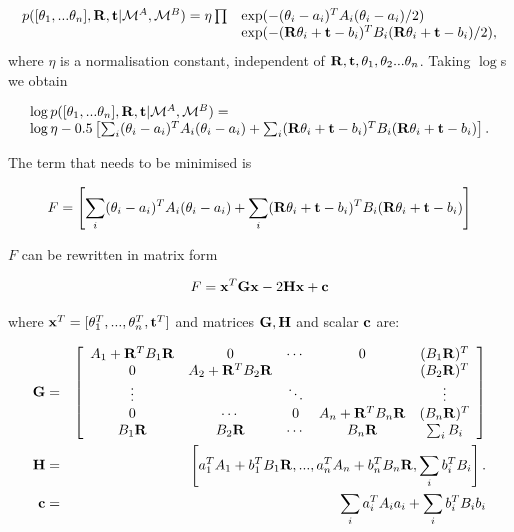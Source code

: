 \begin{equation}
\begin{array}{ll}
p([\theta_1, ...\theta_n],{\bf R},{\bf t} | \mapA, \mapB) =
 \eta \prod& \exp(-(\theta_i - a_i)^T A_i (\theta_i - a_i)/2)\\
&\exp(-({\bf R}\theta_i + {\bf t} - b_i)^T B_i
({\bf R}\theta_i + {\bf t} - b_i)/2),
\label{eqn:align_w0}
\end{array}
\end{equation}
where $\eta$ is a normalisation constant, independent of ${\bf
R,t},\theta_1, \theta_2 ...\theta_n$. Taking $\log$s we obtain

\begin{equation}
\begin{array}{l}
\log p([\theta_1, ...\theta_n],{\bf R},{\bf t} | \mapA, \mapB) =\\
\log\eta - 0.5 \left[
\sum_i (\theta_i - a_i)^T A_i (\theta_i - a_i) +
\sum_i ({\bf R}\theta_i + {\bf t} - b_i)^T B_i({\bf R}\theta_i + {\bf t} - b_i)
\right].
\end{array}
\label{eqn:align_log_prob}
\end{equation}

The term that needs to be minimised is

$$
F = \left[ \sum_i (\theta_i - a_i)^T A_i (\theta_i - a_i) +
\sum_i ({\bf R}\theta_i + {\bf t} - b_i)^T B_i ({\bf R}\theta_i + {\bf t} - b_i)
\right]
$$

$F$ can be rewritten in matrix form

$$
F =  {\bf x}^T{\bf Gx} -2{\bf Hx} + {\bf c}
$$

where ${\bf x}^T = [\theta_1^T,...,\theta_n^T, {\bf t}^T]$ and
matrices ${\bf G},{\bf H}$ and scalar ${\bf c}$ are:

\begin{eqnarray}
{\bf G} &=& \left[ \begin{array}{ccccc}
A_1 + {\bf R}^TB_1{\bf R}&
0&\cdots&0&
(B_1{\bf R})^T\\
0&A_2 + {\bf R}^TB_2{\bf R}&&&(B_2{\bf R})^T\\
\vdots & & \ddots & & \vdots\\
0&\cdots&0&
A_n + {\bf R}^TB_n{\bf R}&
(B_n{\bf R})^T\\
B_1{\bf R}&B_2{\bf R}&\cdots&
B_n{\bf R}&
\sum_i B_i
\end{array} \right]\\
{\bf H}  &=& \left[a_1^TA_1+b_1^TB_1{\bf  R},...,
a_n^TA_n+b_n^TB_n{\bf R},
\sum_i b_i^TB_i
 \right].\\
{\bf c} &=& \sum_i a_i^TA_ia_i + \sum_i b_i^TB_ib_i
\end{eqnarray}

